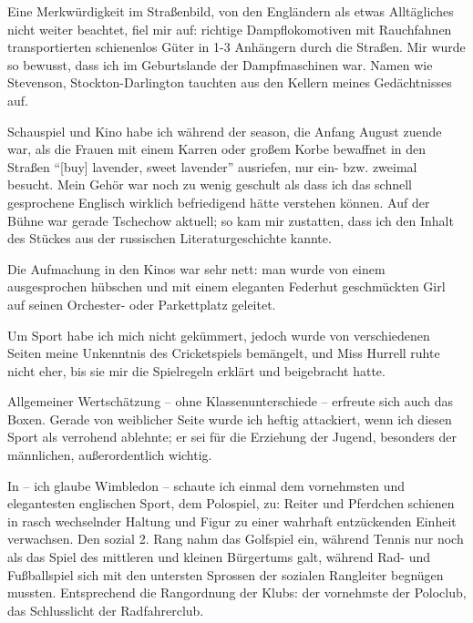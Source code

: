 Eine Merkwürdigkeit im Straßenbild, von den Engländern als etwas Alltägliches nicht weiter beachtet, fiel mir auf: richtige Dampflokomotiven mit Rauchfahnen transportierten schienenlos Güter in 1-3 Anhängern durch die Straßen. Mir wurde so bewusst, dass ich im Geburtslande der Dampfmaschinen war. Namen wie Stevenson, Stockton-Darlington tauchten aus den Kellern meines Gedächtnisses auf.

Schauspiel und Kino habe ich während der season, die Anfang August zuende war, als die Frauen mit einem Karren oder großem Korbe bewaffnet in den Straßen \enquote{[buy] lavender, sweet lavender} ausriefen, nur ein- bzw. zweimal besucht. Mein Gehör war noch zu wenig geschult als dass ich das schnell gesprochene Englisch wirklich befriedigend hätte verstehen können. Auf der Bühne war gerade Tschechow aktuell; so kam mir zustatten, dass ich den Inhalt des Stückes aus der russischen Literaturgeschichte kannte.

Die Aufmachung in den Kinos war sehr nett: man wurde von einem ausgesprochen hübschen und mit einem eleganten Federhut geschmückten Girl auf seinen Orchester- oder Parkettplatz geleitet.

Um Sport habe ich mich nicht gekümmert, jedoch wurde von verschiedenen Seiten meine Unkenntnis des Cricketspiels bemängelt, und Miss Hurrell ruhte nicht eher, bis sie mir die Spielregeln erklärt und beigebracht hatte.

Allgemeiner Wertschätzung -- ohne Klassenunterschiede -- erfreute sich auch das Boxen. Gerade von weiblicher Seite wurde ich heftig attackiert, wenn ich diesen Sport als verrohend ablehnte; er sei für die Erziehung der Jugend, besonders der männlichen, außerordentlich wichtig.

In -- ich glaube Wimbledon -- schaute ich einmal dem vornehmsten und elegantesten englischen Sport, dem Polospiel, zu: Reiter und Pferdchen schienen in rasch wechselnder Haltung und Figur zu einer wahrhaft entzückenden Einheit verwachsen. Den sozial 2. Rang nahm das Golfspiel ein, während Tennis nur noch als das Spiel des mittleren und kleinen Bürgertums galt, während Rad- und Fußballspiel sich mit den untersten Sprossen der sozialen Rangleiter begnügen mussten. Entsprechend die Rangordnung der Klubs: der vornehmste der Poloclub, das Schlusslicht der Radfahrerclub.

